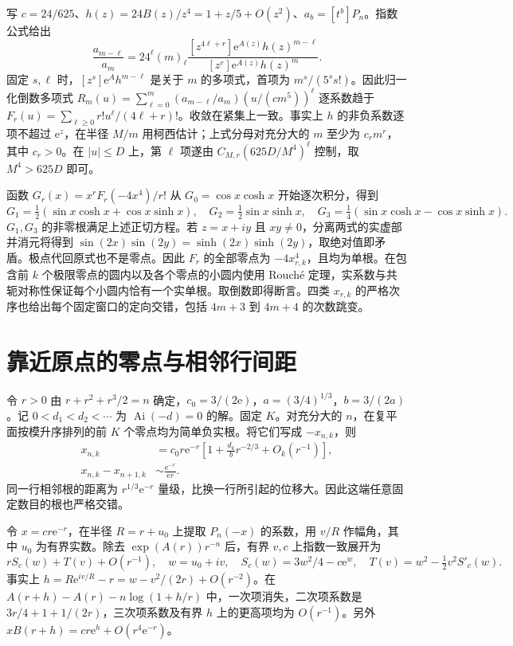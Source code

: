 \documentclass[UTF8,fontset=fandol,11pt,a4paper]{ctexart}
\newcommand{\expo}{\mathrm e}
\begin{document}
写 $c=24/625$、$h(z)=24B(z)/z^4=1+z/5+O(z^2)$、$a_b=[t^b]P_n$。指数公式给出
\[
 \frac{a_{m-\ell}}{a_m}
 =24^\ell(m)_\ell
 \frac{[z^{4\ell+r}]\expo^{A(z)}h(z)^{m-\ell}}
 {[z^r]\expo^{A(z)}h(z)^m}.
\]
固定 $s,\ell$ 时，$[z^s]\expo^Ah^{m-\ell}$ 是关于 $m$ 的多项式，首项为 $m^s/(5^s s!)$。因此归一化倒数多项式 $R_m(u)=\sum_{\ell=0}^m(a_{m-\ell}/a_m)(u/(cm^5))^\ell$ 逐系数趋于 $F_r(u)=\sum_{\ell\ge0}r!u^\ell/(4\ell+r)!$。收敛在紧集上一致。事实上 $h$ 的非负系数逐项不超过 $\expo^z$，在半径 $M/m$ 用柯西估计；上式分母对充分大的 $m$ 至少为 $c_r m^r$，其中 $c_r>0$。在 $|u|\le D$ 上，第 $\ell$ 项遂由 $C_{M,r}(625D/M^4)^\ell$ 控制，取 $M^4>625D$ 即可。

函数 $G_r(x)=x^rF_r(-4x^4)/r!$ 从 $G_0=\cos x\cosh x$ 开始逐次积分，得到
\[
 G_1=\tfrac12(\sin x\cosh x+\cos x\sinh x),\quad
 G_2=\tfrac12\sin x\sinh x,\quad
 G_3=\tfrac14(\sin x\cosh x-\cos x\sinh x).
\]
$G_1,G_3$ 的非零根满足上述正切方程。若 $z=x+iy$ 且 $xy\ne0$，分离两式的实虚部并消元将得到 $\sin(2x)\sin(2y)=\sinh(2x)\sinh(2y)$，取绝对值即矛盾。极点代回原式也不是零点。因此 $F_r$ 的全部零点为 $-4x_{r,k}^4$，且均为单根。在包含前 $k$ 个极限零点的圆内以及各个零点的小圆内使用 Rouché 定理，实系数与共轭对称性保证每个小圆内恰有一个实单根。取倒数即得断言。四类 $x_{r,k}$ 的严格次序也给出每个固定窗口的定向交错，包括 $4m+3$ 到 $4m+4$ 的次数跳变。

\section{靠近原点的零点与相邻行间距}
令 $r>0$ 由 $r+r^2+r^3/2=n$ 确定，$c_0=3/(2\expo)$，$a=(3/4)^{1/3}$，$b=3/(2a)$。记 $0<d_1<d_2<\cdots$ 为 $\operatorname{Ai}(-d)=0$ 的解。固定 $K$。对充分大的 $n$，在复平面按模升序排列的前 $K$ 个零点均为简单负实根。将它们写成 $-x_{n,k}$，则
\begin{align*}
x_{n,k}&=c_0r\expo^{-r}\left[1+\frac{d_k}{b}r^{-2/3}+O_k(r^{-1})\right],\\
x_{n,k}-x_{n+1,k}&\sim \frac{\expo^{-r}}{\expo r}.
\end{align*}
同一行相邻根的距离为 $r^{1/3}\expo^{-r}$ 量级，比换一行所引起的位移大。因此这端任意固定数目的根也严格交错。

令 $x=cr\expo^{-r}$，在半径 $R=r+u_0$ 上提取 $P_n(-x)$ 的系数，用 $v/R$ 作幅角，其中 $u_0$ 为有界实数。除去 $\exp(A(r))r^{-n}$ 后，有界 $v,c$ 上指数一致展开为
\[
 rS_c(w)+T(v)+O(r^{-1}),\quad w=u_0+iv,\quad
 S_c(w)=3w^2/4-c\expo^w,\quad T(v)=w^2-\tfrac12v^2S'_c(w).
\]
事实上 $h=R\expo^{iv/R}-r=w-v^2/(2r)+O(r^{-2})$。在 $A(r+h)-A(r)-n\log(1+h/r)$ 中，一次项消失，二次项系数是 $3r/4+1+1/(2r)$，三次项系数及有界 $h$ 上的更高项均为 $O(r^{-1})$。另外 $xB(r+h)=cr\expo^h+O(r^4\expo^{-r})$。
\end{document}
